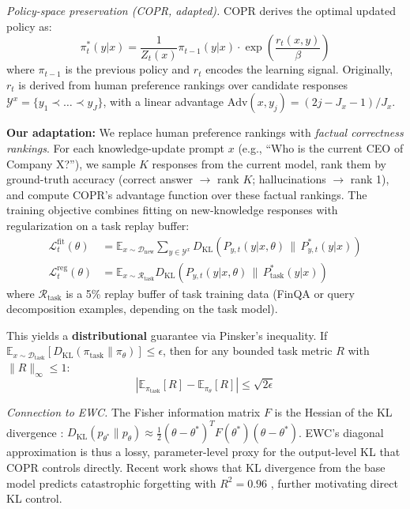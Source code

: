 \documentclass{article}
\begin{document}
\textit{Policy-space preservation (COPR, adapted).}
COPR \citep{zhang2024copr} derives the optimal updated policy as:
\begin{equation}
    \pi^*_t(y|x) = \frac{1}{Z_t(x)} \pi_{t-1}(y|x) \cdot \exp\!\left(\frac{r_t(x,y)}{\beta}\right)
\end{equation}
where $\pi_{t-1}$ is the previous policy and $r_t$ encodes the learning signal. Originally, $r_t$ is derived from human preference rankings over candidate responses $\mathcal{Y}^x = \{y_1 \prec \ldots \prec y_J\}$, with a linear advantage $\mathrm{Adv}(x, y_j) = (2j - J_x - 1)/J_x$.

\textbf{Our adaptation:} We replace human preference rankings with \emph{factual correctness rankings}. For each knowledge-update prompt $x$ (e.g., ``Who is the current CEO of Company X?''), we sample $K$ responses from the current model, rank them by ground-truth accuracy (correct answer $\to$ rank $K$; hallucinations $\to$ rank 1), and compute COPR's advantage function over these factual rankings. The training objective combines fitting on new-knowledge responses with regularization on a task replay buffer:
\begin{align}
    \mathcal{L}^{\text{fit}}_t(\theta) &= \mathbb{E}_{x \sim \mathcal{D}_{\text{new}}} \sum_{y \in \mathcal{Y}^x} D_{\mathrm{KL}}\!\left(P_{y,t}(y|x,\theta) \,\|\, P^*_{y,t}(y|x)\right) \\
    \mathcal{L}^{\text{reg}}_t(\theta) &= \mathbb{E}_{x \sim \mathcal{R}_{\text{task}}} D_{\mathrm{KL}}\!\left(P_{y,t}(y|x,\theta) \,\|\, P^*_{\text{task}}(y|x)\right)
\end{align}
where $\mathcal{R}_{\text{task}}$ is a 5\% replay buffer of task training data (FinQA or query decomposition examples, depending on the task model).

This yields a \textbf{distributional} guarantee via Pinsker's inequality. If $\mathbb{E}_{x \sim \mathcal{D}_{\text{task}}}[D_{\mathrm{KL}}(\pi_{\text{task}} \| \pi_\theta)] \leq \epsilon$, then for any bounded task metric $R$ with $\|R\|_\infty \leq 1$:
\begin{equation}
    |\mathbb{E}_{\pi_{\text{task}}}[R] - \mathbb{E}_{\pi_\theta}[R]| \leq \sqrt{2\epsilon}
\end{equation}

\textit{Connection to EWC.}
The Fisher information matrix $F$ is the Hessian of the KL divergence \citep{kirkpatrick2017overcoming}: $D_{\mathrm{KL}}(p_{\theta^*} \| p_\theta) \approx \tfrac{1}{2}(\theta - \theta^*)^T F(\theta^*) (\theta - \theta^*)$. EWC's diagonal approximation is thus a lossy, parameter-level proxy for the output-level KL that COPR controls directly. Recent work shows that KL divergence from the base model predicts catastrophic forgetting with $R^2 = 0.96$ \citep{razak2025rl}, further motivating direct KL control.
\end{document}
